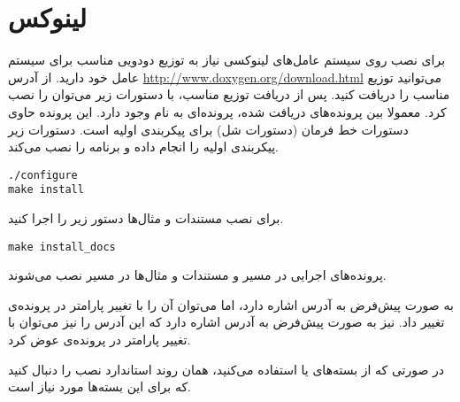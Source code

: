%
% 
% 
% 
%
\section{لینوکس}
\label{install/linux}

\begin{sloppypar}
برای نصب  روی سیستم عامل‌های لینوکسی نیاز به توزیع دودویی مناسب برای سیستم عامل خود دارید. از آدرس 
\url{http://www.doxygen.org/download.html}
 می‌توانید توزیع مناسب را دریافت کنید. پس از دریافت توزیع مناسب، با دستورات زیر می‌توان  را نصب کرد. 
معمولا بین پرونده‌های دریافت شده، پرونده‌ای به نام  وجود دارد. این پرونده حاوی دستورات خط فرمان (دستورات شل) برای 
پیکربندی اولیه است. دستورات زیر پیکربندی اولیه را انجام داده و برنامه را نصب می‌کند.
\end{sloppypar}
\begin{latin}
\lstset{language=C++}  
\begin{lstlisting}[frame=single] 
./configure
make install
\end{lstlisting}
\end{latin}
برای نصب مستندات و مثال‌ها دستور زیر را اجرا کنید.
\begin{latin}
\lstset{language=C++}  
\begin{lstlisting}[frame=single] 
make install_docs
\end{lstlisting}
\end{latin}
پرونده‌های اجرایی در مسیر 
 و مستندات و مثال‌ها در مسیر 
  نصب می‌شوند.

\begin{sloppypar}
به صورت پیش‌فرض 
 به آدرس 
 اشاره دارد، اما می‌توان آن را با تغییر پارامتر 
 در پرونده‌ی  تغییر داد. 
 نیز به صورت پیش‌فرض به آدرس 
 اشاره دارد که این آدرس را نیز می‌توان با تغییر پارامتر 
 در پرونده‌ی  عوض کرد.
\end{sloppypar}

در صورتی که از بسته‌های  یا  استفاده می‌کنید، همان روند استاندارد 
نصب را دنبال کنید که برای این بسته‌ها مورد نیاز است.

